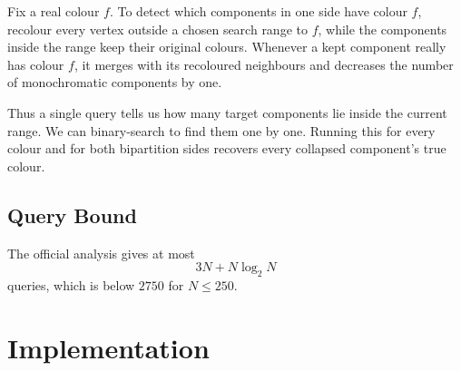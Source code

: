 \documentclass[11pt,a4paper]{article}
\begin{document}
Fix a real colour $f$. To detect which components in one side have colour $f$, recolour every vertex outside a chosen search range to $f$, while the components inside the range keep their original colours. Whenever a kept component really has colour $f$, it merges with its recoloured neighbours and decreases the number of monochromatic components by one.

Thus a single query tells us how many target components lie inside the current range. We can binary-search to find them one by one. Running this for every colour and for both bipartition sides recovers every collapsed component's true colour.

\subsection{Query Bound}
The official analysis gives at most
\[
3N + N \log_2 N
\]
queries, which is below $2750$ for $N \le 250$.

\section{Implementation}
\end{document}

